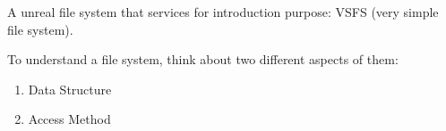 
        A unreal file system that services for introduction purpose: VSFS (very simple file system).

        To understand a file system, think about two different aspects of them:
        \begin{enumerate}
            \item Data Structure
            \item Access Method
        \end{enumerate}













